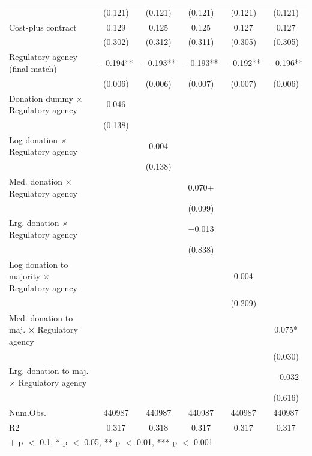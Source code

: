 \begin{table}[H]
{\begin{tabular}[t]{lccccc}
 & (\num{0.121}) & (\num{0.121}) & (\num{0.121}) & (\num{0.121}) & (\num{0.121})\\
Cost-plus contract & \num{0.129} & \num{0.125} & \num{0.125} & \num{0.127} & \num{0.127}\\
 & (\num{0.302}) & (\num{0.312}) & (\num{0.311}) & (\num{0.305}) & (\num{0.305})\\
Regulatory agency (final match) & \num{-0.194}** & \num{-0.193}** & \num{-0.193}** & \num{-0.192}** & \num{-0.196}**\\
 & (\num{0.006}) & (\num{0.006}) & (\num{0.007}) & (\num{0.007}) & (\num{0.006})\\
Donation dummy $\times$ Regulatory agency & \num{0.046} &  &  &  & \\
 & (\num{0.138}) &  &  &  & \\
Log donation $\times$ Regulatory agency &  & \num{0.004} &  &  & \\
 &  & (\num{0.138}) &  &  & \\
Med. donation $\times$ Regulatory agency &  &  & \num{0.070}+ &  & \\
 &  &  & (\num{0.099}) &  & \\
Lrg. donation $\times$ Regulatory agency &  &  & \num{-0.013} &  & \\
 &  &  & (\num{0.838}) &  & \\
Log donation to majority $\times$ Regulatory agency &  &  &  & \num{0.004} & \\
 &  &  &  & (\num{0.209}) & \\
Med. donation to maj. $\times$ Regulatory agency &  &  &  &  & \num{0.075}*\\
 &  &  &  &  & (\num{0.030})\\
Lrg. donation to maj. $\times$ Regulatory agency &  &  &  &  & \num{-0.032}\\
 &  &  &  &  & (\num{0.616})\\
\midrule
Num.Obs. & \num{440987} & \num{440987} & \num{440987} & \num{440987} & \num{440987}\\
R2 & \num{0.317} & \num{0.318} & \num{0.317} & \num{0.317} & \num{0.317}\\
\bottomrule
\multicolumn{6}{l}{\rule{0pt}{1em}+ p $<$ 0.1, * p $<$ 0.05, ** p $<$ 0.01, *** p $<$ 0.001}\\
\end{tabular}}
\end{table}
